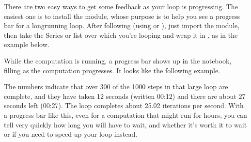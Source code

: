 \documentclass[letterpaper,10pt,english]{jupyterBook}
\begin{document}
\sphinxAtStartPar
There are two easy ways to get some feedback as your loop is progressing.  The easiest one is to install the  module, whose purpose is to help you see a progress bar for a long\sphinxhyphen{}running loop.  After following  (using  or ), just import the module, then take the Series or list over which you’re looping and wrap it in , as in the example below.

\begin{sphinxVerbatim}[commandchars=\\\{\}]
   

  \PYG{p}{[} \PYG{p}{]}
    \PYG{p}{[}\PYG{p}{]}   
     \PYG{p}{[}\PYG{p}{]}  \PYG{p}{[}\PYG{p}{]}  \PYGZbs{}
       \PYG{p}{[}\PYG{p}{]}  \PYG{p}{[}\PYG{p}{]}
            
\PYG{p}{[}\PYG{p}{]}
\end{sphinxVerbatim}

\sphinxAtStartPar
While the computation is running, a progress bar shows up in the notebook, filling as the computation progresses.  It looks like the following example.

\sphinxAtStartPar
{}

\sphinxAtStartPar
The numbers indicate that over 300 of the 1000 steps in that large loop are complete, and they have taken 12 seconds (written 00:12) and there are about 27 seconds left (00:27).  The loop completes about 25.02 iterations per second.  With a progress bar like this, even for a computation that might run for hours, you can tell very quickly how long you will have to wait, and whether it’s worth it to wait or if you need to speed up your loop instead.
\end{document}
